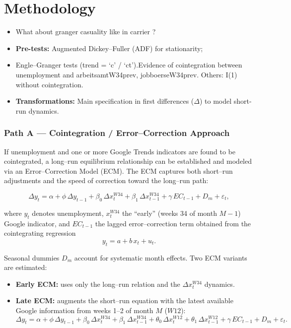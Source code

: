 \documentclass{article}
\begin{document}
\section{Methodology}
\begin{itemize}
\item What about granger casuality like in carrier ?
  \item \textbf{Pre-tests:} Augmented Dickey–Fuller (ADF) for stationarity; 
  \item Engle–Granger tests (trend = ‘c’ / ‘ct’).Evidence of cointegration between unemployment and arbeitsamtW34prev, jobboerseW34prev. Others: I(1) without cointegration.
  \item \textbf{Transformations:} Main specification in first differences ($\Delta$) to model short-run dynamics.
\end{itemize}




\subsubsection*{Path A — Cointegration / Error–Correction Approach}

If unemployment and one or more Google Trends indicators are found to be cointegrated,
a long–run equilibrium relationship can be established and modeled via an
Error–Correction Model (ECM). The ECM captures both short–run adjustments
and the speed of correction toward the long–run path:

\begin{equation}
\Delta y_t 
= \alpha 
+ \phi\,\Delta y_{t-1}
+ \beta_0\,\Delta x_t^{W34}
+ \beta_1\,\Delta x_{t-1}^{W34}
+ \gamma\, EC_{t-1}
+ D_m
+ \varepsilon_t,
\end{equation}

where $y_t$ denotes unemployment, $x_t^{W34}$ the ``early'' (weeks 34 of month $M-1$)
Google indicator, and $EC_{t-1}$ the lagged error–correction term obtained from the
cointegrating regression
\begin{equation}
y_t = a + b\,x_t + u_t.
\end{equation}

Seasonal dummies $D_m$ account for systematic month effects.  
Two ECM variants are estimated:

\begin{itemize}
  \item \textbf{Early ECM:} uses only the long–run relation and the $\Delta x_t^{W34}$ dynamics.
  \item \textbf{Late ECM:} augments the short–run equation with the latest
  available Google information from weeks 1–2 of month $M$ ($W12$):
  \[
  \Delta y_t = \alpha + \phi\,\Delta y_{t-1} 
  + \beta_0\,\Delta x_t^{W34} + \beta_1\,\Delta x_{t-1}^{W34}
  + \theta_0\,\Delta x_t^{W12} + \theta_1\,\Delta x_{t-1}^{W12}
  + \gamma\,EC_{t-1} + D_m + \varepsilon_t.
  \]
\end{itemize}
\end{document}
